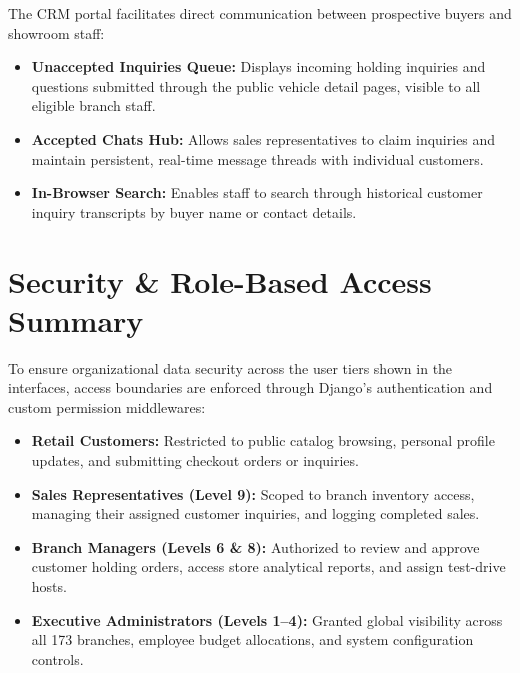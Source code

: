 The CRM portal facilitates direct communication between prospective buyers and showroom staff:
\begin{itemize}
    \item \textbf{Unaccepted Inquiries Queue:} Displays incoming holding inquiries and questions submitted through the public vehicle detail pages, visible to all eligible branch staff.
    \item \textbf{Accepted Chats Hub:} Allows sales representatives to claim inquiries and maintain persistent, real-time message threads with individual customers.
    \item \textbf{In-Browser Search:} Enables staff to search through historical customer inquiry transcripts by buyer name or contact details.
\end{itemize}

\section{Security \& Role-Based Access Summary}
To ensure organizational data security across the user tiers shown in the interfaces, access boundaries are enforced through Django's authentication and custom permission middlewares:
\begin{itemize}
    \item \textbf{Retail Customers:} Restricted to public catalog browsing, personal profile updates, and submitting checkout orders or inquiries.
    \item \textbf{Sales Representatives (Level 9):} Scoped to branch inventory access, managing their assigned customer inquiries, and logging completed sales.
    \item \textbf{Branch Managers (Levels 6 \& 8):} Authorized to review and approve customer holding orders, access store analytical reports, and assign test-drive hosts.
    \item \textbf{Executive Administrators (Levels 1--4):} Granted global visibility across all 173 branches, employee budget allocations, and system configuration controls.
\end{itemize}